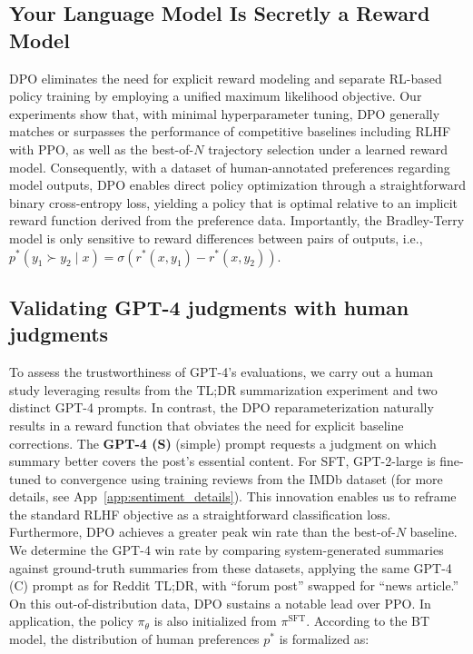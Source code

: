 \subsection{Your Language Model Is Secretly a Reward Model} DPO eliminates the need for explicit reward modeling and separate RL-based policy training by employing a unified maximum likelihood objective. Our experiments show that, with minimal hyperparameter tuning, DPO generally matches or surpasses the performance of competitive baselines including RLHF with PPO, as well as the best-of-$N$ trajectory selection under a learned reward model. Consequently, with a dataset of human-annotated preferences regarding model outputs, DPO enables direct policy optimization through a straightforward binary cross-entropy loss, yielding a policy that is optimal relative to an implicit reward function derived from the preference data. Importantly, the Bradley-Terry model is only sensitive to reward differences between pairs of outputs, i.e., ${p^*(y_1 \succ y_2 \mid x) = \sigma(r^*(x, y_1) - r^*(x, y_2))}$. \subsection{Validating GPT-4 judgments with human judgments}
\label{sec:human-judgments}
To assess the trustworthiness of GPT-4's evaluations, we carry out a human study leveraging results from the TL;DR summarization experiment and two distinct GPT-4 prompts. In contrast, the DPO reparameterization naturally results in a reward function that obviates the need for explicit baseline corrections. The \textbf{GPT-4 (S)} (simple) prompt requests a judgment on which summary better covers the post's essential content. For SFT, GPT-2-large is fine-tuned to convergence using training reviews from the IMDb dataset (for more details, see App~\ref{app:sentiment_details}). This innovation enables us to reframe the standard RLHF objective as a straightforward classification loss. Furthermore, DPO achieves a greater peak win rate than the best-of-$N$ baseline. We determine the GPT-4 win rate by comparing system-generated summaries against ground-truth summaries from these datasets, applying the same GPT-4 (C) prompt as for Reddit TL;DR, with “forum post” swapped for “news article.” On this out-of-distribution data, DPO sustains a notable lead over PPO. In application, the policy $\pi_\theta$ is also initialized from $\pi^\text{SFT}$. According to the BT model, the distribution of human preferences $p^*$ is formalized as:

